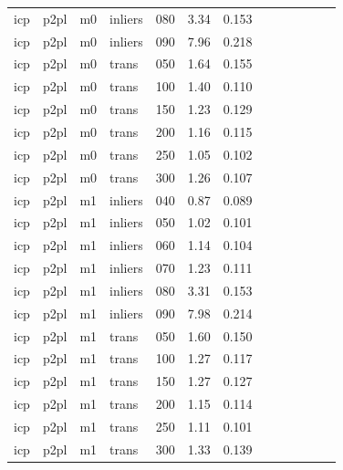 \begin{table}[htbp]
\begin{tabular}{lllllrrrrrrrr}
  icp & p2pl & m0 & inliers & 080 & 3.34 & 0.153 \\
  icp & p2pl & m0 & inliers & 090 & 7.96 & 0.218 \\
  icp & p2pl & m0 & trans & 050 & 1.64 & 0.155 \\
  icp & p2pl & m0 & trans & 100 & 1.40 & 0.110 \\
  icp & p2pl & m0 & trans & 150 & 1.23 & 0.129 \\
  icp & p2pl & m0 & trans & 200 & 1.16 & 0.115 \\
  icp & p2pl & m0 & trans & 250 & 1.05 & 0.102 \\
  icp & p2pl & m0 & trans & 300 & 1.26 & 0.107 \\
  icp & p2pl & m1 & inliers & 040 & 0.87 & 0.089 \\
  icp & p2pl & m1 & inliers & 050 & 1.02 & 0.101 \\
  icp & p2pl & m1 & inliers & 060 & 1.14 & 0.104 \\
  icp & p2pl & m1 & inliers & 070 & 1.23 & 0.111 \\
  icp & p2pl & m1 & inliers & 080 & 3.31 & 0.153 \\
  icp & p2pl & m1 & inliers & 090 & 7.98 & 0.214 \\
  icp & p2pl & m1 & trans & 050 & 1.60 & 0.150 \\
  icp & p2pl & m1 & trans & 100 & 1.27 & 0.117 \\
  icp & p2pl & m1 & trans & 150 & 1.27 & 0.127 \\
  icp & p2pl & m1 & trans & 200 & 1.15 & 0.114 \\
  icp & p2pl & m1 & trans & 250 & 1.11 & 0.101 \\
  icp & p2pl & m1 & trans & 300 & 1.33 & 0.139 \\
\bottomrule
\end{tabular}
\end{table}

